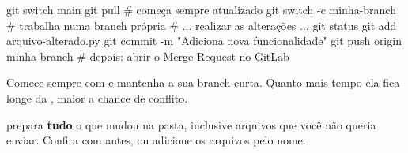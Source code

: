 \begin{center}
\end{center}

\begin{terminal}
git switch main
git pull                              # começa sempre atualizado
git switch -c minha-branch            # trabalha numa branch própria
# ... realizar as alterações ...
git status
git add arquivo-alterado.py
git commit -m "Adiciona nova funcionalidade"
git push origin minha-branch
# depois: abrir o Merge Request no GitLab
\end{terminal}

\begin{dica}
Comece sempre com  e mantenha a sua branch curta. Quanto mais tempo ela fica longe da , maior a chance de conflito.
\end{dica}

\begin{atencao}
 prepara \textbf{tudo} o que mudou na pasta, inclusive arquivos que você não queria enviar. Confira com  antes, ou adicione os arquivos pelo nome.
\end{atencao}

